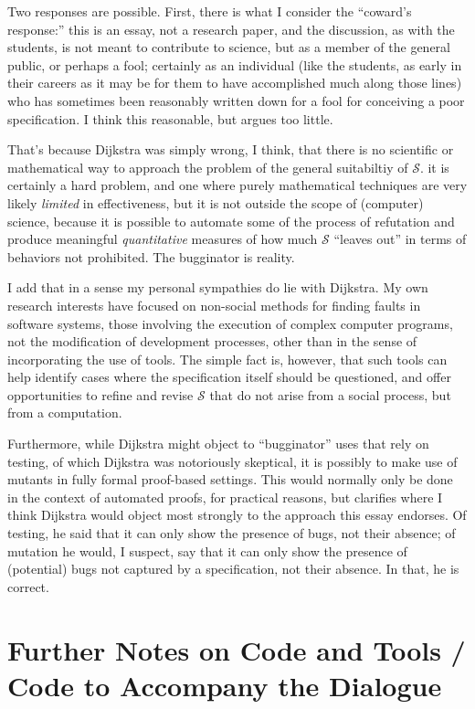 \documentclass[sigplan]{acmart}
\begin{document}
Two responses are possible.  First, there is what I consider the
``coward's response:''  this is an essay, not a research paper, and
the discussion, as with the students, is not meant to contribute to
science, but as a member of the general public, or perhaps a fool;
certainly as an individual (like the students, as early in their
careers as it may be for them to have accomplished much along those
lines) who has sometimes been reasonably written down for a fool for
conceiving a poor specification.  I think this reasonable, but argues
too little.

That's because Dijkstra was simply wrong, I think, that there is no scientific or
mathematical way to approach the problem of the general suitabiltiy of
$\mathcal{S}$. it is certainly a hard problem, and one where purely mathematical
techniques are very likely \emph{limited} in effectiveness, but it is not outside the
scope of (computer) science, because it is possible to automate some of the
process of refutation and produce meaningful \emph{quantitative} measures of how much
$\mathcal{S}$ ``leaves out'' in terms of behaviors not prohibited.
The bugginator is reality.


I add that in a sense my personal sympathies do lie with
Dijkstra.  My own research interests have focused on non-social methods
for finding faults in software systems, those involving the execution
of complex computer programs, not the modification of development
processes, other than in the sense of incorporating the use of tools.
The simple fact is, however, that such tools can help identify cases
where the specification itself should be questioned, and offer
opportunities to refine and revise $\mathcal{S}$ that do not arise
from a social process, but from a computation.

Furthermore, while Dijkstra might object to ``bugginator'' uses that
rely on testing, of which Dijkstra was notoriously skeptical, it is
possibly to make use of mutants in fully formal proof-based settings.  This would
normally only be done in the context of automated proofs, for
practical reasons, but clarifies where I think Dijkstra would object
most strongly to the approach this essay endorses.  Of testing, he said that it can only show the presence
of bugs, not their absence; of mutation he would, I suspect, say that
it can only show the presence of (potential) bugs not captured by a
specification, not their absence.  In that, he is correct.

\section{Further Notes on Code and Tools / Code to Accompany the Dialogue}
\end{document}
